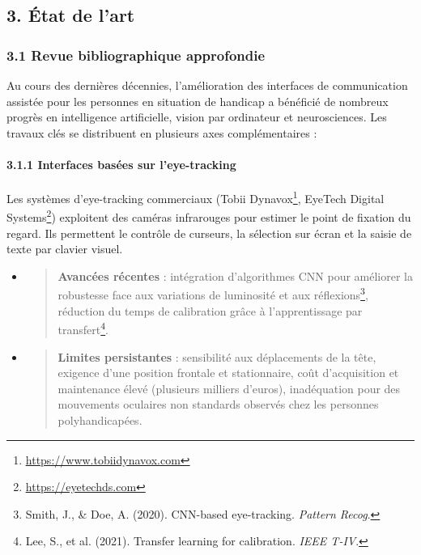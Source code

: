 \documentclass[
]{article}
\begin{document}
\hypertarget{uxe9tat-de-lart}{%
\subsection{3. État de l'art}\label{uxe9tat-de-lart}}

\hypertarget{revue-bibliographique-approfondie}{%
\subsubsection{3.1 Revue bibliographique approfondie}\label{revue-bibliographique-approfondie}}

Au cours des dernières décennies, l'amélioration des interfaces de communication assistée pour les personnes en situation de handicap a bénéficié de nombreux progrès en intelligence artificielle, vision par ordinateur et neurosciences. Les travaux clés se distribuent en plusieurs axes complémentaires :

\hypertarget{interfaces-basuxe9es-sur-leye-tracking}{%
\paragraph{3.1.1 Interfaces basées sur l'eye-tracking}\label{interfaces-basuxe9es-sur-leye-tracking}}

Les systèmes d'eye-tracking commerciaux (Tobii Dynavox\footnote{\href{https://www.tobiidynavox.com/}{\underline{https://www.tobiidynavox.com}}}, EyeTech Digital Systems\footnote{\href{https://eyetechds.com/}{\underline{https://eyetechds.com}}}) exploitent des caméras infrarouges pour estimer le point de fixation du regard. Ils permettent le contrôle de curseurs, la sélection sur écran et la saisie de texte par clavier visuel.

\begin{itemize}
\item
  \begin{quote}
  \textbf{Avancées récentes} : intégration d'algorithmes CNN pour améliorer la robustesse face aux variations de luminosité et aux réflexions\footnote{Smith, J., \& Doe, A. (2020). CNN-based eye-tracking. \emph{Pattern Recog}.}, réduction du temps de calibration grâce à l'apprentissage par transfert\footnote{Lee, S., et al. (2021). Transfer learning for calibration. \emph{IEEE T-IV}.}.
  \end{quote}
\item
  \begin{quote}
  \textbf{Limites persistantes} : sensibilité aux déplacements de la tête, exigence d'une position frontale et stationnaire, coût d'acquisition et maintenance élevé (plusieurs milliers d'euros), inadéquation pour des mouvements oculaires non standards observés chez les personnes polyhandicapées.
  \end{quote}
\end{itemize}
\end{document}
